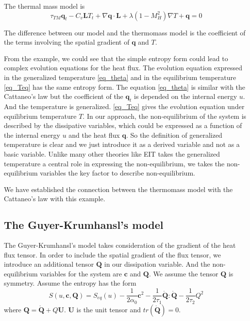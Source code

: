 \documentclass[a4paper]{article}
\begin{document}
The thermal mass model is 
\begin{equation}
\tau_{TM} \mathbf{q}_t-C_v \mathbf{L}T_t+\nabla \mathbf{q} \cdot \mathbf{L}+\lambda(1-M_H^2)\nabla T+\mathbf{q}=0
\end{equation}

The difference between our model and the thermomass model is the coefficient of the terms involving the spatial gradient of $\mathbf{q}$ and $T$.

From the example, we could see that the simple entropy form could lead to complex evolution equations for the heat flux. The evolution equation expressed in the generalized temperature \eqref{eq_theta} and in the equilibrium temperature \eqref{eq_Teq} has the same entropy form. The equation  \eqref{eq_theta} is similar with the Cattaneo's law but the coefficient of the $\mathbf{q}_t$ is depended on the internal energy $u$. And the temperature is generalized. \eqref{eq_Teq} gives the evolution equation under equilibrium temperature $T$. In our approach, the non-equilibrium of the system is described by the dissipative variables, which could be expressed as a function of the internal energy $u$ and the heat flux $\mathbf{q}$. So the definition of generalized temperature is clear and we just introduce it as a derived variable and not as a basic variable. Unlike many other theories like EIT takes the generalized temperature a central role in expressing the non-equilibrium, we takes the non-equilibrium variables the key factor to describe non-equilibrium.

We have established the connection between the thermomass model with the Cattaneo's law with this example.
\subsection{The Guyer-Krumhansl's model}
The Guyer-Krumhansl's model takes consideration of the gradient of the heat flux tensor. In order to include the spatial gradient of the flux tensor, we introduce an additional tensor $\mathbf{Q}$ in our dissipation variable. And the non-equilibrium variables for the system are $\mathbf{c}$ and $\mathbf{Q}$.
We assume the tensor $\mathbf{Q}$ is symmetry.
Assume the entropy has the form
\begin{equation}
S(u,\mathbf{c},\mathbf{Q})=S_{eq}(u)-\frac{1}{2 \alpha_0}\mathbf{c}^2-\frac{1}{2\tau_1} {\mathring{\mathbf{Q}}}:{\mathring{\mathbf{Q}}}-\frac{1}{2\tau_2}Q^2
\end{equation}
where $\mathbf{Q}=\mathring{\mathbf{Q}}+Q\mathbf{U}$. $\mathbf{U}$ is the unit tensor and $tr(\mathring{\mathbf{Q}})=0$.
\end{document}
